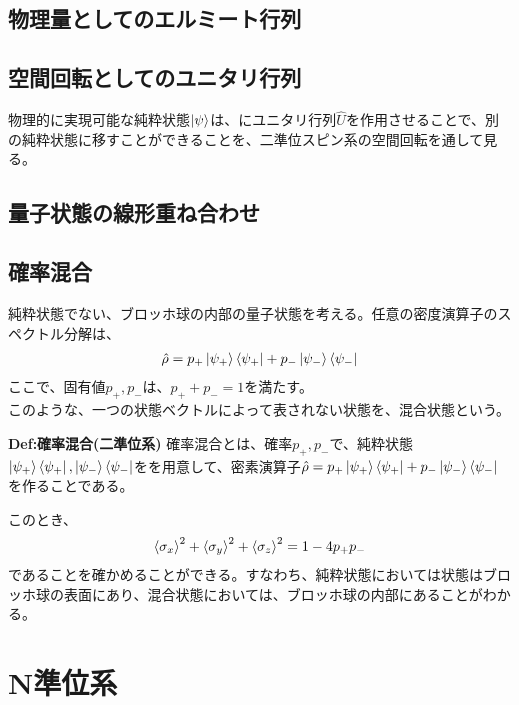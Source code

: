 \documentclass[a4paper,11pt]{jsarticle}
\begin{document}
\subsection{物理量としてのエルミート行列}

\subsection{空間回転としてのユニタリ行列}
物理的に実現可能な純粋状態$\ket{\psi}$は、にユニタリ行列$\hat{U}$を作用させることで、別の純粋状態に移すことができることを、二準位スピン系の空間回転を通して見る。\\

\subsection{量子状態の線形重ね合わせ}

\subsection{確率混合}
純粋状態でない、ブロッホ球の内部の量子状態を考える。任意の密度演算子のスペクトル分解は、
\begin{align}
    \hat{\rho} = p_+\ket{\psi_+}\bra{\psi_+} + p_-\ket{\psi_-}\bra{\psi_-}
\end{align}
ここで、固有値$p_+,p_-$は、$p_+ + p_- = 1$を満たす。\\
このような、一つの状態ベクトルによって表されない状態を、混合状態という。\\

\begin{itembox}[l]{\textbf{Def:確率混合(二準位系)}}
    確率混合とは、確率$p_+,p_-$で、純粋状態$\ket{\psi_+}\bra{\psi_+},\ket{\psi_-}\bra{\psi_-}$をを用意して、密素演算子$\hat{\rho}=p_+\ket{\psi_+}\bra{\psi_+} + p_-\ket{\psi_-}\bra{\psi_-}$を作ることである。
\end{itembox}

このとき、
\begin{align}
    \ev{\sigma_x} ^2+ \ev{\sigma_y}^2 + \ev{\sigma_z}^2 =1-4p_+p_-
\end{align}
であることを確かめることができる。すなわち、純粋状態においては状態はブロッホ球の表面にあり、混合状態においては、ブロッホ球の内部にあることがわかる。\\


\section{N準位系}
\end{document}
